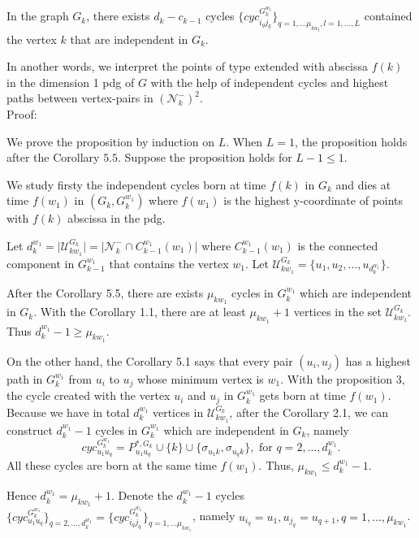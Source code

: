 \documentclass[a4paper,12pt]{article}
\numberwithin{equation}{section}
\begin{document}
	In the graph $G_k$, there exists $d_k - c_{k-1}$ cycles $\{cyc_{i_q j_q}^{G^{w_l}_k}\}_{q=1,\ldots \mu_{kw_l}, l = 1,\ldots,L}$ contained the vertex $k$ that are independent in $G_k$.
	
	In another words, we interpret the points of type extended with abscissa $f(k)$ in the dimension 1 pdg of $G$ with the help of independent cycles and highest paths between vertex-pairs in $(\mathcal{N}_k^-)^2$.\\
	
	
	\noindent Proof:
	 
	We prove the proposition by induction on $L$. When $L=1$, the proposition holds after the Corollary $5.5$.
	Suppose the proposition holds for $L-1 \leq 1$. 
	
	We study firsty the independent cycles born at time $f(k)$ in $G_k$ and dies at time $f(w_1)$ in $(G_k,G^{w_1}_k)$ where $f(w_1)$ is the highest y-coordinate of points with $f(k)$ abscissa in the pdg. 
	
	Let $d_k^{w_1} = \vert \mathcal{U}_{kw_1}^{G_k} \vert = \vert \mathcal{N}_k^- \cap C_{k-1}^{w_1}(w_1) \vert$ where $C_{k-1}^{w_1}(w_1)$ is the connected component in $G_{k-1}^{w_1}$ that contains the vertex $w_1$. Let $\displaystyle \mathcal{U}_{kw_1}^{G_k} = \{ u_1,u_2,\ldots,u_{d^{w_1}_k} \}$.
	
	After the Corollary 5.5, there are exists $\mu_{kw_1}$ cycles in $G_k^{w_1}$ which are independent in $G_k$. With the Corollary 1.1, there are at least $\mu_{kw_1}+1$ vertices in the set $\mathcal{U}_{kw_1}^{G_k}$. Thus $d_{k}^{w_1} -1 \geq \mu_{kw_1}$.
	
	On the other hand, the Corollary 5.1 says that every pair $(u_i,u_j)$ has a highest path in $G_k^{w_1}$ from $u_i$ to $u_j$ whose minimum vertex is $w_1$. With the proposition 3, the cycle created with the vertex $u_i$ and $u_j$ in $G_k^{w_1}$ gets born at time $f(w_1)$. Because we have in total $d_k^{w_1}$ vertices in $\mathcal{U}_{kw_1}^{G_k}$, after the Corollary 2.1, we can construct $d_k^{w_1} - 1$ cycles in $G_{k}^{w_1}$ which are independent in $G_k$, namely
	$$ cyc_{u_1 u_q}^{G_{k}^{w_1}} = P_{u_1 u_q}^{*,G_k} \cup \{k\} \cup \{ \sigma_{u_1 k}, \sigma_{u_q k} \}, \text{ for } q = 2,\ldots, d^{w_1}_k.$$
	All these cycles are born at the same time $f(w_1)$. Thus, $\mu_{kw_1} \leq d_k^{w_1} - 1$. 
	
	Hence $d_k^{w_1} = \mu_{kw_1} +1$. Denote the $d_k^{w_1} -1$ cycles $\displaystyle \{ cyc_{u_1 u_q}^{G_{k}^{w_1}} \}_{q=2,\dots,d^{w_1}_k} = \{ cyc_{i_q j_q}^{G^{w_1}_k}\}_{q=1,\ldots \mu_{kw_1}}$, namely $u_{i_q} = u_1, u_{j_q} = u_{q+1}, q = 1,\ldots, \mu_{kw_1}$. \\
	
\end{document}
